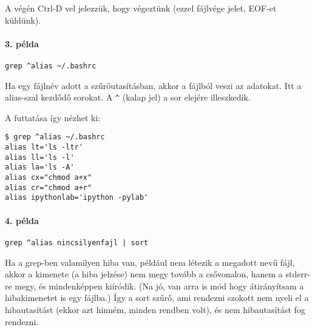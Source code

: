 \documentclass[a4paper]{article}
\begin{document}
A végén Ctrl-D vel jelezzük, hogy végeztünk (ezzel fájlvége jelet, EOF-et
küldünk).


\paragraph{3. példa}

\verb+grep ^alias ~/.bashrc+

Ha egy fájlnév adott a szűrőutasításban, akkor a fájlból veszi az
adatokat. Itt a alias-szal kezdődő sorokat. A \verb+^+ (kalap jel) a sor
elejére illeszkedik.


A futtatása így nézhet ki:
\begin{verbatim}
$ grep ^alias ~/.bashrc 
alias lt='ls -ltr'
alias ll='ls -l'
alias la='ls -A'
alias cx="chmod a+x"
alias cr="chmod a+r"
alias ipythonlab='ipython -pylab'
\end{verbatim}

\paragraph{4. példa}

\verb+grep ^alias nincsilyenfajl | sort+

Ha a grep-ben valamilyen hiba van, például nem létezik a megadott
nevű fájl, akkor a kimenete (a hiba jelzése) nem megy tovább a
csővonalon, hanem a stderr-re megy, és mindenképpen kiíródik. (Na jó,
van arra is mód hogy átirányítsam a hibakimenetet is egy fájlba.) Így a
sort szűrő, ami rendezni szokott nem nyeli el a hibautasítást (ekkor azt
hinném, minden rendben volt), és nem hibautasítást fog rendezni.

\end{document}
